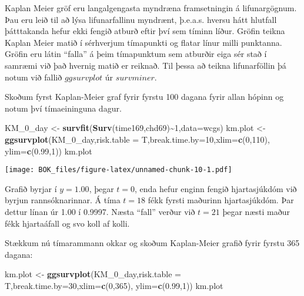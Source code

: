 \documentclass[
]{book}
\newenvironment{Shaded}{\begin{snugshade}}{\end{snugshade}}
\newcommand{\DataTypeTok}[1]{\textcolor[rgb]{0.13,0.29,0.53}{#1}}
\newcommand{\DecValTok}[1]{\textcolor[rgb]{0.00,0.00,0.81}{#1}}
\newcommand{\FloatTok}[1]{\textcolor[rgb]{0.00,0.00,0.81}{#1}}
\newcommand{\KeywordTok}[1]{\textcolor[rgb]{0.13,0.29,0.53}{\textbf{#1}}}
\newcommand{\NormalTok}[1]{#1}
\newcommand{\OperatorTok}[1]{\textcolor[rgb]{0.81,0.36,0.00}{\textbf{#1}}}
\newcommand{\StringTok}[1]{\textcolor[rgb]{0.31,0.60,0.02}{#1}}
\begin{document}
Kaplan Meier gröf eru langalgengasta myndræna framsetningin á lifunargögnum. Þau eru leið til að lýsa lifunarfallinu myndrænt, þ.e.a.s. hversu hátt hlutfall þátttakanda hefur ekki fengið atburð eftir því sem tíminn líður. Gröfin teikna Kaplan Meier matið í sérhverjum tímapunkti og flatar línur milli punktanna. Gröfin eru látin ``falla'' á þeim tímapunktum sem atburðir eiga sér stað í samræmi við það hvernig matið er reiknað. Til þessa að teikna lifunarföllin þá notum við fallið \(ggsurvplot\) úr \(survminer\).

Skoðum fyrst Kaplan-Meier graf fyrir fyrstu 100 dagana fyrir allan hópinn og notum því tímaeininguna dagur.

\begin{Shaded}
\begin{Highlighting}[]
\NormalTok{KM\_}\DecValTok{0}\NormalTok{\_day <{-}}\StringTok{ }\KeywordTok{survfit}\NormalTok{(}\KeywordTok{Surv}\NormalTok{(time169,chd69)}\OperatorTok{\textasciitilde{}}\DecValTok{1}\NormalTok{,}\DataTypeTok{data=}\NormalTok{wcgs)}
\NormalTok{km.plot <{-}}\StringTok{ }\KeywordTok{ggsurvplot}\NormalTok{(KM\_}\DecValTok{0}\NormalTok{\_day,}\DataTypeTok{risk.table =}\NormalTok{ T,}\DataTypeTok{break.time.by=}\DecValTok{10}\NormalTok{,}\DataTypeTok{xlim=}\KeywordTok{c}\NormalTok{(}\DecValTok{0}\NormalTok{,}\DecValTok{110}\NormalTok{),}
                      \DataTypeTok{ylim=}\KeywordTok{c}\NormalTok{(}\FloatTok{0.99}\NormalTok{,}\DecValTok{1}\NormalTok{)) }
\NormalTok{km.plot }
\end{Highlighting}
\end{Shaded}

\texttt{[image: BOK\_files/figure-latex/unnamed-chunk-10-1.pdf]}

Grafið byrjar í \(y=1.00\), þegar \(t=0\), enda hefur enginn fengið hjartasjúkdóm við byrjun rannsóknarinnar. Á tíma \(t=18\) fékk fyrsti maðurinn hjartasjúkdóm. Þar dettur línan úr 1.00 í 0.9997. Næsta ``fall'' verður við \(t=21\) þegar næsti maður fékk hjartaáfall og svo koll af kolli.

Stækkum nú tímarammann okkar og skoðum Kaplan-Meier grafið fyrir fyrstu 365 dagana:

\begin{Shaded}
\begin{Highlighting}[]
\NormalTok{km.plot <{-}}\StringTok{ }\KeywordTok{ggsurvplot}\NormalTok{(KM\_}\DecValTok{0}\NormalTok{\_day,}\DataTypeTok{risk.table =}\NormalTok{ T,}\DataTypeTok{break.time.by=}\DecValTok{30}\NormalTok{,}\DataTypeTok{xlim=}\KeywordTok{c}\NormalTok{(}\DecValTok{0}\NormalTok{,}\DecValTok{365}\NormalTok{),}
                      \DataTypeTok{ylim=}\KeywordTok{c}\NormalTok{(}\FloatTok{0.99}\NormalTok{,}\DecValTok{1}\NormalTok{)) }
\NormalTok{km.plot }
\end{Highlighting}
\end{Shaded}
\end{document}
